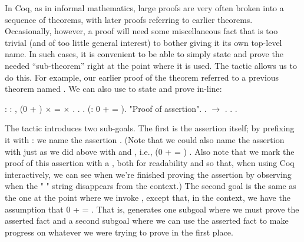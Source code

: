\documentclass[12pt]{report}
\begin{document}
 In Coq, as in informal mathematics, large proofs are very
    often broken into a sequence of theorems, with later proofs
    referring to earlier theorems.  Occasionally, however, a proof
    will need some miscellaneous fact that is too trivial (and of too
    little general interest) to bother giving it its own top-level
    name.  In such cases, it is convenient to be able to simply state
    and prove the needed ``sub-theorem'' right at the point where it is
    used.  The  tactic allows us to do this.  For example, our
    earlier proof of the  theorem referred to a previous
    theorem named .  We can also use  to state and
    prove  in-line: \begin{coqdoccode}
\coqdocemptyline
\coqdocnoindent
{}  : \coqdockw{\ensuremath{\forall}}   : ,\coqdoceol
\coqdocindent{1.00em}
(0 + ) \ensuremath{\times}  =  \ensuremath{\times} .\coqdoceol
\coqdocnoindent
{}.\coqdoceol
\coqdocindent{1.00em}
  .\coqdoceol
\coqdocindent{1.00em}
 (: 0 +  = ).\coqdoceol
\coqdocindent{2.00em}
 "Proof of assertion". .\coqdoceol
\coqdocindent{1.00em}
 \ensuremath{\rightarrow} .\coqdoceol
\coqdocindent{1.00em}
. .\coqdoceol
\coqdocemptyline
\end{coqdoccode}
The  tactic introduces two sub-goals.  The first is
    the assertion itself; by prefixing it with : we name the
    assertion .  (Note that we could also name the assertion with
     just as we did above with  and , i.e.,
     (0 +  = )  .  Also note that we mark the proof of
    this assertion with a , both for readability and so that,
    when using Coq interactively, we can see when we're finished
    proving the assertion by observing when the "  "
    string disappears from the context.)  The second goal is the same
    as the one at the point where we invoke , except that, in
    the context, we have the assumption  that 0 +  = .  That
    is,  generates one subgoal where we must prove the
    asserted fact and a second subgoal where we can use the asserted
    fact to make progress on whatever we were trying to prove in the
    first place. 
\end{document}
